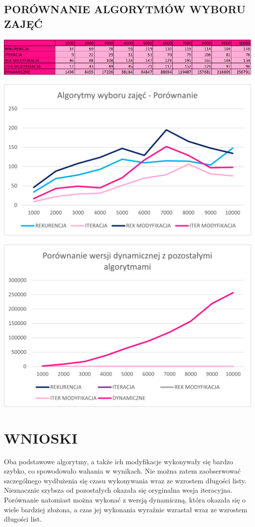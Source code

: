 \documentclass{article}
\begin{document}
\subsection*{PORÓWNANIE ALGORYTMÓW WYBORU ZAJĘĆ}
\begin{center}
	\includegraphics[width = \textwidth]{Obraz5.png}
\end{center}
\begin{center}
	\includegraphics[width = \textwidth]{Obraz4.png}
\end{center}
\begin{center}
	\includegraphics[width = \textwidth]{Obraz1.png}
\end{center}
\section*{WNIOSKI}
Oba podstawowe algorytmy, a także ich modyfikacje wykonywały się bardzo szybko, co spowodowało wahania w wynikach. Nie można zatem zaobserwować szczególnego wydłużenia się czasu wykonywania wraz ze wzrostem długości listy. Nieznacznie szybsza od pozostałych okazała się oryginalna wesja iteracyjna. Porównanie natomiast można wykonać z wersją dynamiczną, która okazała się o wiele bardziej złożona, a czas jej wykonania wyraźnie wzrastał wraz ze wzrostem długości list.
\end{document}
